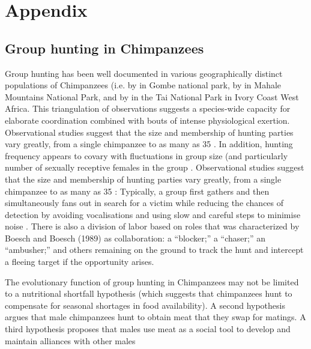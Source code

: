 \chapter{\label{app1:intro}Appendix}












\section{Group hunting in Chimpanzees\label{sect:groupHunt}}
Group hunting has been well documented in various geographically distinct populations of Chimpanzees (i.e. by \textcite{Goodall1986}  in Gombe national park, by \textcite{Uehara1997} in Mahale Mountains National Park, and by \textcite{Boesch1989, Boesch1994} in the Tai National Park in Ivory Coast West Africa.  This triangulation of observations suggests a species-wide capacity for elaborate coordination combined with bouts of intense physiological exertion.   Observational studies suggest that the size and membership of hunting parties vary greatly, from a single chimpanzee to as many as 35 \citep{Stanford1994}.   In addition, hunting frequency appears to covary with fluctuations in group size (and particularly number of sexually receptive females in the group \citep{Stanford1996}.
Observational studies suggest that the size and membership of hunting parties vary greatly, from a single chimpanzee to as many as 35 \citep{Stanford1994}: Typically, a group first gathers and then simultaneously fans out in search for a victim while reducing the chances of detection by avoiding vocalisations and using slow and careful steps to minimise noise \citep{Boesch1989,Mitani2001}.  There is also a division of labor based on roles that was characterized by Boesch and Boesch (1989) as collaboration: a ``blocker;'' a ``chaser;'' an ``ambusher;'' and others remaining on the ground to track the hunt and intercept a fleeing target if the opportunity arises.

The evolutionary function of group hunting in Chimpanzees may not be limited to a nutritional shortfall hypothesis (which suggests that chimpanzees hunt to compensate for seasonal shortages in food availability).  A second hypothesis argues that male chimpanzees hunt to obtain meat that they swap for matings. A third hypothesis proposes that males use meat as a social tool to develop and maintain alliances with other males \citep{Mitani2001}





